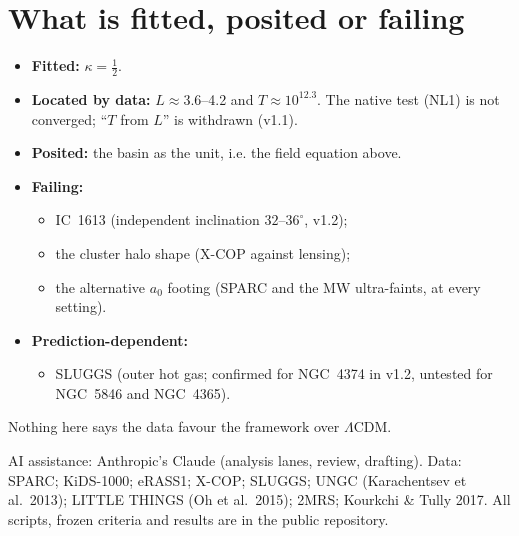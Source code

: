 \documentclass[10pt]{article}
\begin{document}
\section{What is fitted, posited or failing}
\begin{itemize}
\item \textbf{Fitted:} $\kappa=\tfrac12$.
\item \textbf{Located by data:} $L\approx3.6$--4.2 and $T\approx10^{12.3}$. The native test (NL1) is not converged; ``$T$ from $L$'' is withdrawn (v1.1).
\item \textbf{Posited:} the basin as the unit, i.e. the field equation above.
\item \textbf{Failing:}
  \begin{itemize}
  \item IC~1613 (independent inclination $32$--$36^\circ$, v1.2);
  \item the cluster halo shape (X-COP against lensing);
  \item the alternative $a_0$ footing (SPARC and the MW ultra-faints, at every setting).
  \end{itemize}
\item \textbf{Prediction-dependent:}
  \begin{itemize}
  \item SLUGGS (outer hot gas; confirmed for NGC~4374 in v1.2, untested for NGC~5846 and NGC~4365).
  \end{itemize}
\end{itemize}
Nothing here says the data favour the framework over $\Lambda$CDM.

\medskip
{\small AI assistance: Anthropic's Claude (analysis lanes, review, drafting). Data: SPARC; KiDS-1000; eRASS1; X-COP; SLUGGS; UNGC (Karachentsev et al.\ 2013); LITTLE THINGS (Oh et al.\ 2015); 2MRS; Kourkchi \& Tully 2017. All scripts, frozen criteria and results are in the public repository.}
\end{document}
